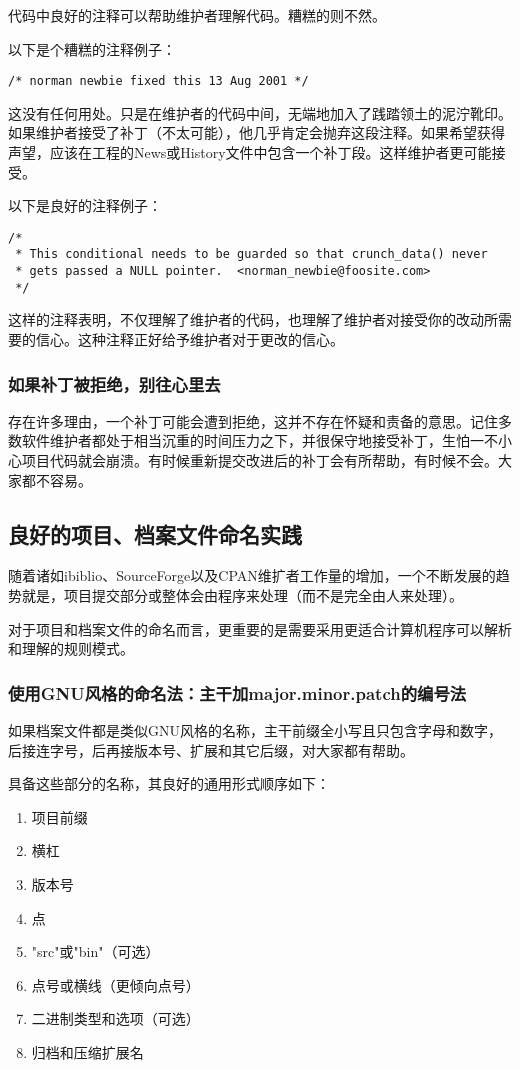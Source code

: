 \documentclass[12pt,oneside]{ctexbook}
\begin{document}
\begin{common-format}
代码中良好的注释可以帮助维护者理解代码。糟糕的则不然。

以下是个糟糕的注释例子：
\begin{Verbatim}
/* norman newbie fixed this 13 Aug 2001 */
\end{Verbatim}

这没有任何用处。只是在维护者的代码中间，无端地加入了践踏领土的泥泞靴印。如果维护者接受了补丁（不太可能），他几乎肯定会抛弃这段注释。如果希望获得声望，应该在工程的News或History文件中包含一个补丁段。这样维护者更可能接受。

以下是良好的注释例子：
\begin{Verbatim}
/*
 * This conditional needs to be guarded so that crunch_data() never
 * gets passed a NULL pointer.  <norman_newbie@foosite.com>
 */
\end{Verbatim}

这样的注释表明，不仅理解了维护者的代码，也理解了维护者对接受你的改动所需要的信心。这种注释正好给予维护者对于更改的信心。

\subsubsection{如果补丁被拒绝，别往心里去}
存在许多理由，一个补丁可能会遭到拒绝，这并不存在怀疑和责备的意思。记住多数软件维护者都处于相当沉重的时间压力之下，并很保守地接受补丁，生怕一不小心项目代码就会崩溃。有时候重新提交改进后的补丁会有所帮助，有时候不会。大家都不容易。

\subsection{良好的项目、档案文件命名实践}
随着诸如ibiblio、SourceForge以及CPAN维扩者工作量的增加，一个不断发展的趋势就是，项目提交部分或整体会由程序来处理（而不是完全由人来处理）。

对于项目和档案文件的命名而言，更重要的是需要采用更适合计算机程序可以解析和理解的规则模式。

\subsubsection{使用GNU风格的命名法：主干加major.minor.patch的编号法}
如果档案文件都是类似GNU风格的名称，主干前缀全小写且只包含字母和数字，后接连字号，后再接版本号、扩展和其它后缀，对大家都有帮助。

具备这些部分的名称，其良好的通用形式顺序如下：
\begin{enumerate}
\item 项目前缀
\item 横杠
\item 版本号
\item 点
\item "src"或"bin"（可选）
\item 点号或横线（更倾向点号）
\item 二进制类型和选项（可选）
\item 归档和压缩扩展名
\end{enumerate}


\end{common-format}
\end{document}
